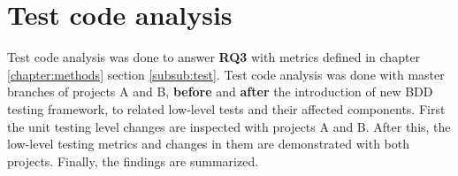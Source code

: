 {\renewcommand{\arraystretch}{1.3}
\begin{table}[H]
        \caption {Developer perception changes of low-level testing} \label{tab:practice-change}
\end{table}
}

\clearpage

\section{Test code analysis}
Test code analysis was done to answer \textbf{RQ3} with metrics defined in chapter \ref{chapter:methods} section \ref{subsub:test}.
Test code analysis was done with master branches of projects A and B, \textbf{before} and \textbf{after} the introduction of new BDD testing framework, to related
low-level tests and their affected components. First the unit testing level changes are inspected with projects A and B.
After this, the low-level testing metrics and changes in them are demonstrated with both projects. Finally, the findings are summarized.

